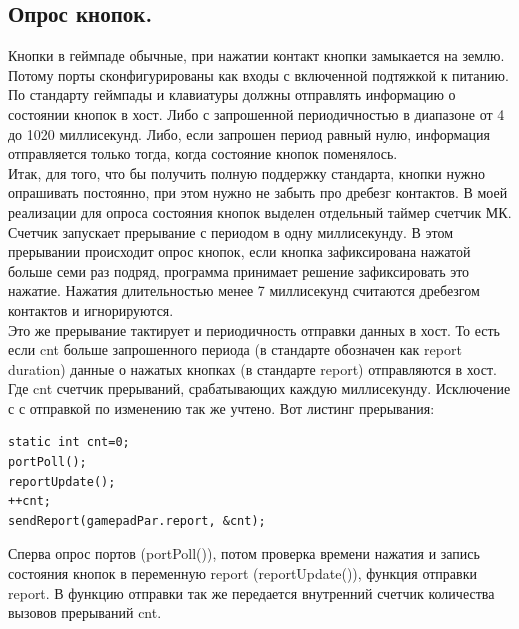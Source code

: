 \documentclass[12pt,a4paper]{article}
\begin{document}
\subsection{Опрос кнопок.}\label{butt}
    Кнопки в геймпаде обычные, при нажатии контакт кнопки замыкается на землю.
    Потому порты сконфигурированы как входы с включенной подтяжкой к питанию.\\
    По стандарту геймпады и клавиатуры должны отправлять информацию о состоянии
    кнопок в хост. Либо с запрошенной периодичностью в диапазоне
    от 4 до 1020 миллисекунд. Либо, если запрошен период равный нулю, информация
    отправляется только тогда, когда состояние кнопок поменялось.\\
    Итак, для того, что бы получить полную поддержку стандарта, кнопки нужно
    опрашивать постоянно, при этом нужно не забыть про дребезг контактов.
    В моей реализации для опроса состояния кнопок выделен отдельный таймер
    счетчик МК. Счетчик запускает прерывание с периодом в одну миллисекунду.
    В этом прерывании происходит опрос кнопок, если кнопка зафиксирована
    нажатой больше семи раз подряд, программа принимает решение зафиксировать
    это нажатие. Нажатия длительностью менее 7 миллисекунд считаются дребезгом
    контактов и игнорируются.\\
    Это же прерывание тактирует и периодичность отправки данных в хост. То есть
    если cnt больше запрошенного периода (в стандарте обозначен как report duration)
    данные о нажатых кнопках (в стандарте report) отправляются в хост. Где cnt
    счетчик прерываний, срабатывающих каждую миллисекунду. Исключение с
    с отправкой по изменению так же учтено. Вот листинг прерывания:
\lstset{language=c}
\begin{lstlisting}
static int cnt=0;
portPoll();
reportUpdate();
++cnt;
sendReport(gamepadPar.report, &cnt);
\end{lstlisting}
    Сперва опрос портов (portPoll()), потом проверка времени нажатия и запись
    состояния кнопок в переменную report (reportUpdate()), функция отправки
    report. В функцию отправки так же передается внутренний счетчик количества
    вызовов прерываний cnt.

\newpage
\end{document}

